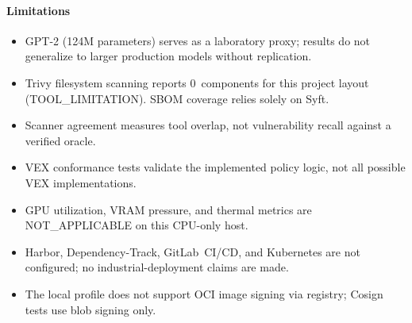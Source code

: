 \paragraph{Limitations}
\begin{itemize}
\item GPT-2 (124M parameters) serves as a laboratory proxy; results do not generalize to larger production models without replication.
\item Trivy filesystem scanning reports 0~components for this project layout (TOOL\_LIMITATION). SBOM coverage relies solely on Syft.
\item Scanner agreement measures tool overlap, not vulnerability recall against a verified oracle.
\item VEX conformance tests validate the implemented policy logic, not all possible VEX implementations.
\item GPU utilization, VRAM pressure, and thermal metrics are NOT\_APPLICABLE on this CPU-only host.
\item Harbor, Dependency-Track, GitLab~CI/CD, and Kubernetes are not configured; no industrial-deployment claims are made.
\item The local profile does not support OCI image signing via registry; Cosign tests use blob signing only.
\end{itemize}